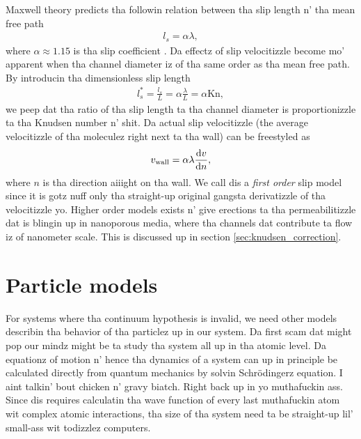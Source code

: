 Maxwell theory predicts tha followin relation between tha slip length n' tha mean free path
\begin{align}
	\label{eq:noslip_sliplength}
	l_s = \alpha \lambda,
\end{align}
where $\alpha\approx 1.15$ is tha slip coefficient \cite{morris1992slip}. Da effectz of slip velocitizzle become mo' apparent when tha channel diameter iz of tha same order as tha mean free path. By introducin tha dimensionless slip length
\begin{align}
	l_s^* = \frac{l_s}{ L} = \alpha \frac{\lambda }{ L} = \alpha \text{Kn},
\end{align}
we peep dat tha ratio of tha slip length ta tha channel diameter is proportionizzle ta tha Knudsen number n' shit. Da actual slip velocitizzle (the average velocitizzle of tha moleculez right next ta tha wall) can be freestyled as
\begin{align}
	\label{eq:linear_slip_velocity}
	v_{\text{wall}} = \alpha\lambda\frac{\mathrm{d}v}{\mathrm{d}n},
\end{align}
where $n$ is tha direction aiiight on tha wall\cite{klinkenberg1941permeability}. We call dis a \textit{first order} slip model since it is gotz nuff only tha straight-up original gangsta derivatizzle of tha velocitizzle yo. Higher order models exists n' give erections ta tha permeabilitizzle dat is blingin up in nanoporous media, where tha channels dat contribute ta flow iz of nanometer scale. This is discussed up in section \ref{sec:knudsen_correction}.

\section{Particle models}
\label{sec:theory_of_fluids_atomic_models}
For systems where tha continuum hypothesis is invalid, we need other models describin tha behavior of tha particlez up in our system. Da first scam dat might pop our mindz might be ta study tha system all up in tha atomic level. Da equationz of motion n' hence tha dynamics of a system can up in principle be calculated directly from quantum mechanics by solvin Schr\"{o}dingerz equation. I aint talkin' bout chicken n' gravy biatch. Right back up in yo muthafuckin ass. Since dis requires calculatin tha wave function of every last muthafuckin atom wit complex atomic interactions, tha size of tha system need ta be straight-up lil' small-ass wit todizzlez computers.

